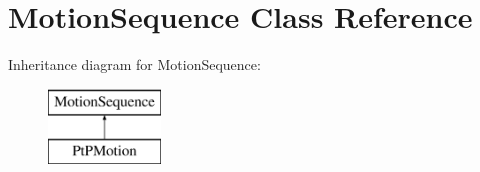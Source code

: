 \hypertarget{class_motion_sequence}{}\section{Motion\+Sequence Class Reference}
\label{class_motion_sequence}
Inheritance diagram for Motion\+Sequence\+:\begin{figure}[H]
\begin{center}
\leavevmode
\includegraphics[height=2.000000cm]{class_motion_sequence}
\end{center}
\end{figure}
